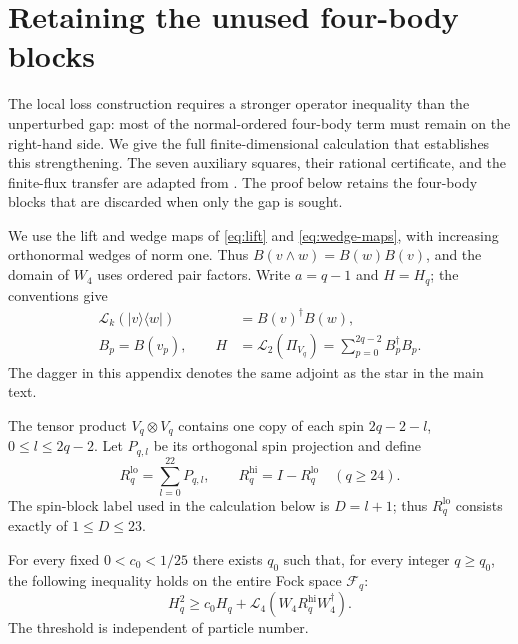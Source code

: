\section{Retaining the unused four-body blocks}
\label{app:retained-blocks}
\begingroup
\newcommand{\rbnorm}[1]{\lVert #1\rVert}
\newcommand{\rbket}[1]{\lvert #1\rangle}
\newcommand{\rbbra}[1]{\langle #1\rvert}
\newcommand{\rbip}[2]{\langle #1,#2\rangle}

The local loss construction requires a stronger operator inequality than
the unperturbed gap: most of the normal-ordered four-body term must remain
on the right-hand side. We give the full finite-dimensional calculation
that establishes this strengthening. The seven auxiliary squares, their
rational certificate, and the finite-flux transfer are adapted from
\cite[Sections 2--6 and 8]{Gap}. The proof below retains the
four-body blocks that are discarded when only the gap is sought.

We use the lift and wedge maps of \eqref{eq:lift} and
\eqref{eq:wedge-maps}, with increasing orthonormal wedges of norm one.
Thus $B(v\wedge w)=B(w)B(v)$, and the domain of $W_4$ uses ordered
pair factors. Write $a=q-1$ and $H=H_q$; the conventions give
\begin{align}
 \mathcal L_k(\rbket v\rbbra w)&=B(v)^\dagger B(w),
       \label{rb:eq:lift}\\
 B_p=B(v_p),\qquad H&=\mathcal L_2(\Pi_{V_q})
            =\sum_{p=0}^{2q-2}B_p^\dagger B_p.
       \label{rb:eq:fockH}
\end{align}
The dagger in this appendix denotes the same adjoint as the star in the
main text.

The tensor product $V_q\otimes V_q$ contains one copy of each spin
$2q-2-l$, $0\le l\le 2q-2$. Let $P_{q,l}$ be its orthogonal
spin projection and define
\begin{equation}\label{rb:eq:retained-projections}
 R_q^{\mathrm{lo}}=\sum_{l=0}^{22}P_{q,l},\qquad
 R_q^{\mathrm{hi}}=I-R_q^{\mathrm{lo}}\quad(q\ge24).
\end{equation}
The spin-block label used in the calculation below is $D=l+1$;
thus $R_q^{\mathrm{lo}}$ consists exactly of $1\le D\le23$.

\begin{proposition}\label{prop:retained-blocks}
For every fixed $0<c_0<1/25$ there exists $q_0$ such that, for every integer
$q\ge q_0$, the following inequality holds on the entire Fock space
$\mathcal F_q$:
\begin{equation}\label{rb:eq:retained-blocks}
 H_q^2\ge c_0H_q+
 \mathcal L_4\!\left(W_4R_q^{\mathrm{hi}}W_4^\dagger\right).
\end{equation}
The threshold is independent of particle number.
\end{proposition}

